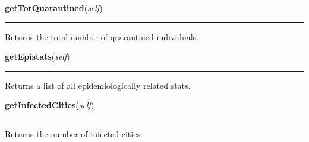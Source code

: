     \label{Epigrass:simobj:graph:getTotQuarantined}

    \vspace{0.5ex}

    \begin{boxedminipage}{\textwidth}

    \raggedright \textbf{getTotQuarantined}(\textit{self})

    \vspace{-1.5ex}

    \rule{\textwidth}{0.5\fboxrule}
    Returns the total number of quarantined individuals.

    \vspace{1ex}

    \end{boxedminipage}

    \label{Epigrass:simobj:graph:getEpistats}

    \vspace{0.5ex}

    \begin{boxedminipage}{\textwidth}

    \raggedright \textbf{getEpistats}(\textit{self})

    \vspace{-1.5ex}

    \rule{\textwidth}{0.5\fboxrule}
    Returns a list of all epidemiologically related stats.

    \vspace{1ex}

    \end{boxedminipage}

    \label{Epigrass:simobj:graph:getInfectedCities}

    \vspace{0.5ex}

    \begin{boxedminipage}{\textwidth}

    \raggedright \textbf{getInfectedCities}(\textit{self})

    \vspace{-1.5ex}

    \rule{\textwidth}{0.5\fboxrule}
    Returns the number of infected cities.

    \vspace{1ex}

    \end{boxedminipage}

